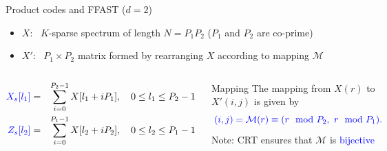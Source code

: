 	\begin{frame}{Product codes and FFAST ($d=2$)}
	
	\begin{itemize}
		\item \alert{$X$}: \ $K$-sparse spectrum of length $N = P_1 P_2$  ($P_1$ and $P_2$ are co-prime)
		\item \alert{$X'$}: \  $P_1 \times P_2$ matrix formed by rearranging $X$ according to mapping $\mathcal{M}$	
	\end{itemize}
	
	\begin{columns}
		
		\begin{block}{}
			\scriptsize{
				\begin{eqnarray}\nonumber
				{\color{blue}X_s[l_1]} & = & \sum_{i=0}^{P_2-1} X[l_1+iP_1], \ \ \ 0 \leq l_1 \leq P_2-1  \label{eqn:Xs_equation} \\ \nonumber
				{\color{blue}Z_s[l_2]} & = & \sum_{i=0}^{P_1-1} X[l_2+iP_2], \ \ \  0 \leq l_2 \leq P_1-1  \label{eqn:Zs} \nonumber
				\end{eqnarray} }	
		\end{block}
		
		\begin{block}{Mapping}
	The mapping from $X(r)$ to $X'(i,j)$ is given by
	\[\color{blue}
	(i,j) = \mathcal{M}(r) \equiv (r \mod P_2, \ r \mod P_1).
	\]
	\alert{Note:} CRT ensures that $\mathcal{M}$ is \textcolor{blue}{bijective}
	    \end{block}
	
	
	
	\begin{figure}[t]
		\centering
		\includegraphics[width=1.8in]{./Figures/ProductCodesMatrix}	
	\end{figure}
	
	\end{columns}
	\end{frame}
